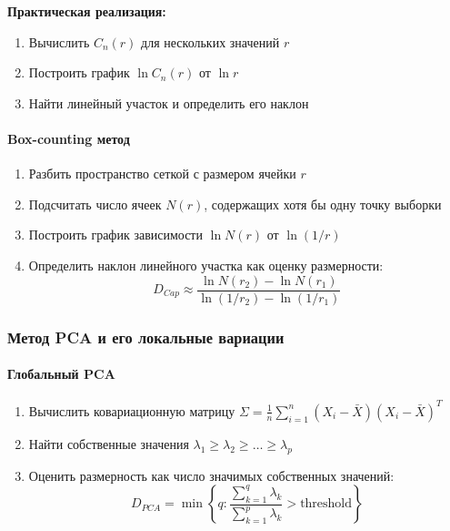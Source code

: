 \documentclass[a4paper,12pt]{article}
\begin{document}
\textbf{Практическая реализация:}
\begin{enumerate}
    \item Вычислить $C_n(r)$ для нескольких значений $r$
    \item Построить график $\ln C_n(r)$ от $\ln r$
    \item Найти линейный участок и определить его наклон
\end{enumerate}

\paragraph{Box-counting метод}

\begin{enumerate}
    \item Разбить пространство сеткой с размером ячейки $r$
    \item Подсчитать число ячеек $N(r)$, содержащих хотя бы одну точку выборки
    \item Построить график зависимости $\ln N(r)$ от $\ln (1/r)$
    \item Определить наклон линейного участка как оценку размерности:
    \begin{equation}
        D_{Cap} \approx \frac{\ln N(r_2) - \ln N(r_1)}{\ln (1/r_2) - \ln (1/r_1)}
    \end{equation}
\end{enumerate}

\subsubsection{Метод PCA и его локальные вариации}

\paragraph{Глобальный PCA}

\begin{enumerate}
    \item Вычислить ковариационную матрицу $\Sigma = \frac{1}{n} \sum_{i=1}^n (X_i - \bar{X})(X_i - \bar{X})^T$
    \item Найти собственные значения $\lambda_1 \geq \lambda_2 \geq \ldots \geq \lambda_p$
    \item Оценить размерность как число значимых собственных значений:
    \begin{equation}
        D_{PCA} = \min\left\{q: \frac{\sum_{k=1}^q \lambda_k}{\sum_{k=1}^p \lambda_k} > \text{threshold}\right\}
    \end{equation}
\end{enumerate}
\end{document}
